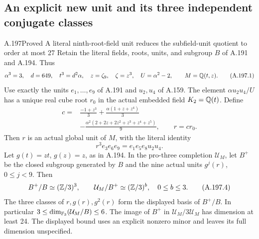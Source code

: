 \subsection{An explicit new unit and its three independent conjugate classes}

\begin{statement}{A.197}{Proved}
{A literal ninth-root-field unit reduces the subfield-unit quotient to order at most 27}
Retain the literal fields, roots, units, and subgroup \(B\) of
A.191 and A.194.  Thus
\[
 \alpha^3=3,\quad d=649,\quad t^3=d^2\alpha,\quad
 z=\zeta_9,\quad \zeta=z^3,\quad U=\alpha^2-2,
 \qquad M=\mathbb Q(t,z).
\tag{A.197.1}
\]
Use exactly the units \(e_1,\ldots,e_9\) of A.191 and
\(u_2,u_4\) of A.159.  The element
\(\alpha u_2u_4/U\) has a unique real cube root \(r_0\)
in the actual embedded field \(K_2=\mathbb Q(t)\).
Define
\[
\begin{aligned}
 c={}&\frac{-1+z^3}{3}
       +\frac{\alpha(1+z+z^4)}{3}\\
    &-\frac{\alpha^2(2+2z+2z^2+z^3+z^4+z^5)}{9},
       \qquad r=cr_0.
\end{aligned}
\tag{A.197.2}
\]
Then \(r\) is an actual global unit of \(M\), with the
literal identity
\[
                r^3e_3e_6e_9=e_1e_5e_8u_2u_4.
\tag{A.197.3}
\]
Let \(g(t)=zt\), \(g(z)=z\), as in A.194.  In the
pro-three completion \(\mathcal U_M\), let \(B^+\) be
the closed subgroup generated by \(B\) and the nine actual
units \(g^j(r)\), \(0\leq j<9\).  Then
\[
       B^+/B\simeq(\mathbb Z/3)^3,\qquad
       \mathcal U_M/B^+\simeq(\mathbb Z/3)^b,
                    \quad 0\leq b\leq3.
\tag{A.197.4}
\]
The three classes of \(r,g(r),g^2(r)\) form the displayed
basis of \(B^+/B\).  In particular
\(3\leq\dim_{\mathbb F_3}(\mathcal U_M/B)\leq6\).
The image of \(B^+\) in \(\mathcal U_M/3\mathcal U_M\)
has dimension at least 24.  The displayed bound uses an
explicit nonzero minor and leaves its full dimension unspecified.
\end{statement}

